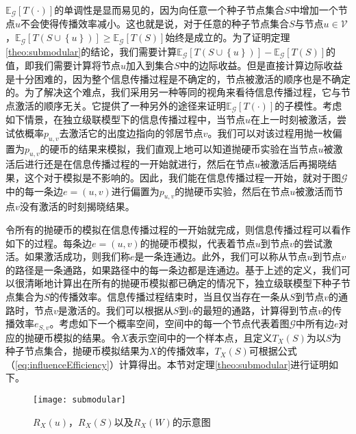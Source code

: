 $\mathbb{E}_\mathcal{G}\left[T\left(\cdot\right)\right]$的单调性是显而易见的，因为向任意一个种子节点集合$S$中增加一个节点$u$不会使得传播效率减小。这也就是说，对于任意的种子节点集合$S$与节点$u \in \mathcal{V}$，$\mathbb{E}_\mathcal{G}\left[T\left( S \cup \left\{u\right\} \right)\right] \geq \mathbb{E}_\mathcal{G}\left[T\left(S\right)\right]$始终是成立的。为了证明定理\ref{theo:submodular}的结论，我们需要计算$\mathbb{E}_\mathcal{G}\left[T\left( S \cup \left\{u\right\} \right)\right] - \mathbb{E}_\mathcal{G}\left[T\left(S\right)\right]$的值，即我们需要计算将节点$u$加入到集合$S$中的边际收益。但是直接计算边际收益是十分困难的，因为整个信息传播过程是不确定的，节点被激活的顺序也是不确定的。为了解决这个难点，我们采用另一种等同的视角来看待信息传播过程，它与节点激活的顺序无关。它提供了一种另外的途径来证明$\mathbb{E}_\mathcal{G}\left[T\left(\cdot\right)\right]$的子模性。考虑如下情景，在独立级联模型下的信息传播过程中，当节点$u$在上一时刻被激活，尝试依概率$p_{u,v}$去激活它的出度边指向的邻居节点$v$。我们可以对该过程用抛一枚偏置为$p_{u,v}$的硬币的结果来模拟，我们直观上地可以知道抛硬币实验在当节点$u$被激活后进行还是在信息传播过程的一开始就进行，然后在节点$u$被激活后再揭晓结果，这个对于模拟是不影响的。因此，我们能在信息传播过程一开始，就对于图$\mathcal{G}$中的每一条边$e=\left(u,v\right)$进行偏置为$p_{u,v}$的抛硬币实验，然后在节点$u$被激活而节点$v$没有激活的时刻揭晓结果。

令所有的抛硬币的模拟在信息传播过程的一开始就完成，则信息传播过程可以看作如下的过程。每条边$e=\left(u,v\right)$的抛硬币模拟，代表着节点$u$到节点$v$的尝试激活。如果激活成功，则我们称$e$是一条连通边。此外，我们可以称从节点$u$到节点$v$的路径是一条通路，如果路径中的每一条边都是连通边。基于上述的定义，我们可以很清晰地计算出在所有的抛硬币模拟都已确定的情况下，独立级联模型下种子节点集合为$S$的传播效率。信息传播过程结束时，当且仅当存在一条从$S$到节点$v$的通路时，节点$v$是激活的。我们可以根据从$S$到$v$的最短的通路，计算得到节点$v$的传播效率$e_{S,v}$。考虑如下一个概率空间，空间中的每一个节点代表着图$\mathcal{G}$中所有边$e$对应的抛硬币模拟的结果。令$X$表示空间中的一个样本点，且定义$T_X\left(S\right)$为以$S$为种子节点集合，抛硬币模拟结果为$X$的传播效率，$T_X\left(S\right)$可根据公式（\ref{eq:influenceEfficiency}）计算得出。本节对定理\ref{theo:submodular}进行证明如下。

\begin{figure}[!ht]
    \centering
    \texttt{[image: submodular]}
    \caption{$R_X\left(u\right)$，$R_X\left(S\right)$以及$R_X\left(W\right)$的示意图}
    \label{fig:submodular}
\end{figure}

